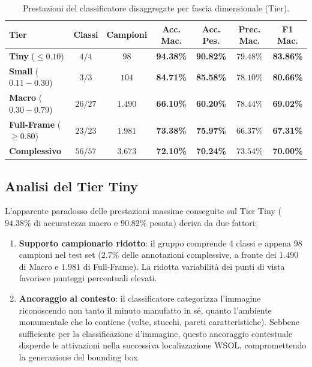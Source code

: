 \begin{table}[htbp]
\centering
\footnotesize
\setlength{\tabcolsep}{3pt}
\begin{tabular*}{\textwidth}{@{\extracolsep{\fill}}lcccccc}
\toprule
\textbf{Tier} & \textbf{Classi} & \textbf{Campioni} & \textbf{Acc. Mac.} & \textbf{Acc. Pes.} & \textbf{Prec. Mac.} & \textbf{F1 Mac.} \\
\midrule
\textbf{Tiny} ($\le 0.10$) & $4 / 4$ & $98$ & \textbf{94.38\%} & \textbf{90.82\%} & $79.48\%$ & \textbf{83.86\%} \\
\textbf{Small} ($0.11 - 0.30$) & $3 / 3$ & $104$ & \textbf{84.71\%} & \textbf{85.58\%} & $78.10\%$ & \textbf{80.66\%} \\
\textbf{Macro} ($0.30 - 0.79$) & $26 / 27$ & $1.490$ & \textbf{66.10\%} & \textbf{60.20\%} & $78.44\%$ & \textbf{69.02\%} \\
\textbf{Full-Frame} ($\ge 0.80$) & $23 / 23$ & $1.981$ & \textbf{73.38\%} & \textbf{75.97\%} & $66.37\%$ & \textbf{67.31\%} \\
\midrule
\textbf{Complessivo} & $56 / 57$ & $3.673$ & \textbf{72.10\%} & \textbf{70.24\%} & $73.54\%$ & \textbf{70.00\%} \\
\bottomrule
\end{tabular*}
\caption{Prestazioni del classificatore disaggregate per fascia dimensionale (Tier).}
\label{tab:prestazioni_tier_class}
\end{table}

\subsection{Analisi del Tier Tiny}
L'apparente paradosso delle prestazioni massime conseguite sul Tier Tiny ($94.38\%$ di accuratezza macro e $90.82\%$ pesata) deriva da due fattori:
\begin{enumerate}
    \item \textbf{Supporto campionario ridotto}: il gruppo comprende 4 classi e appena 98 campioni nel test set ($2.7\%$ delle annotazioni complessive, a fronte dei $1.490$ di Macro e $1.981$ di Full-Frame). La ridotta variabilità dei punti di vista favorisce punteggi percentuali elevati.
    \item \textbf{Ancoraggio al contesto}: il classificatore categorizza l'immagine riconoscendo non tanto il minuto manufatto in sé, quanto l'ambiente monumentale che lo contiene (volte, stucchi, pareti caratteristiche). Sebbene sufficiente per la classificazione d'immagine, questo ancoraggio contestuale disperde le attivazioni nella successiva localizzazione WSOL, compromettendo la generazione del bounding box.
\end{enumerate}


